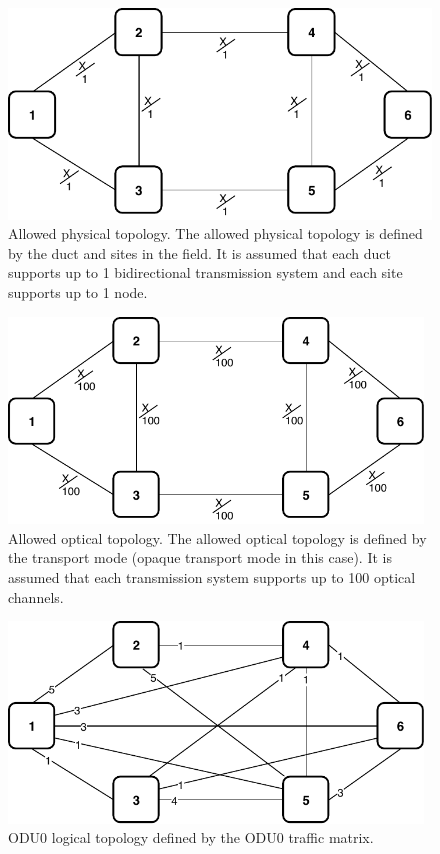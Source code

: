 \vspace{11pt}
\begin{figure}[h!]
\centering
\includegraphics[width=12cm]{sdf/ilp/opaque_protection/figures/allowed_physical_topology}
\caption{Allowed physical topology. The allowed physical topology is defined by the duct and sites in the field. It is assumed that each duct supports up to 1 bidirectional transmission system and each site supports up to 1 node.}
\label{allowed_physical_protectionlow}
\end{figure}
\newpage
\begin{figure}[h!]
\centering
\includegraphics[width=11cm]{sdf/ilp/opaque_protection/figures/allowed_optical_topology}
\caption{Allowed optical topology. The allowed optical topology is defined by the transport mode (opaque transport mode in this case). It is assumed that each transmission system supports up to 100 optical channels.}
\label{allowed_optical_protectionlow}
\end{figure}

\begin{figure}[h!]
\centering
\includegraphics[width=11cm]{sdf/ilp/opaque_protection/figures/logical_topology_ODU0_low}
\caption{ODU0 logical topology defined by the ODU0 traffic matrix.}
\label{logical_ODU0_protectionlow}
\end{figure}

